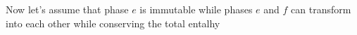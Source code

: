 Now let's assume that phase \(e\) is immutable while phases \(e\) and \(f\) can transform into each other while conserving the total entalhy
